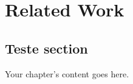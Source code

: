 
\chapter{Related Work}
\label{chapter:relatedWork}

\section{Teste section}
Your chapter's content goes here.
